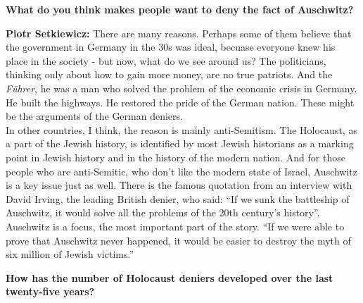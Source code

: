 \textbf{What do you think makes people want to deny the fact of Auschwitz?}

\textbf{Piotr Setkiewicz:} There are many reasons. Perhaps some of them believe that the government in Germany in the 30s was ideal, becuase everyone knew his place in the society - but now, what do we see around us? The politicians, thinking only about how to gain more money, are no true patriots. And the \textit{Führer}, he was a man who solved the problem of the economic crisis in Germany. He built the highways. He restored the pride of the German nation. These might be the arguments of the German deniers.\\
In other countries, I think, the reason is mainly anti-Semitism. The Holocaust, as a part of the Jewish history, is identified by most Jewish historians as a marking point in Jewish history and in the history of the modern nation. And for those people who are anti-Semitic, who don’t like the modern state of Israel, Auschwitz is a key issue just as well. There is the famous quotation from an interview with David Irving, the leading British denier, who said: ``If we sunk the battleship of Auschwitz, it would solve all the problems of the 20th century’s history''. Auschwitz is a focus, the most important part of the story. ``If we were able to prove that Auschwitz never happened, it would be easier to destroy the myth of six million of Jewish victims.''

\textbf{How has the number of Holocaust deniers developed over the last twenty-five years?}

